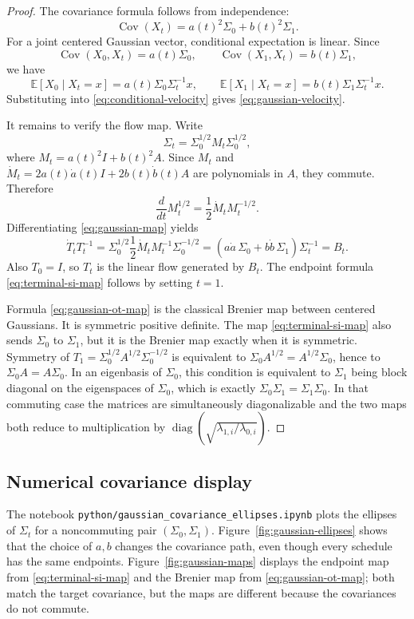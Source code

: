 \documentclass[11pt]{article}
\DeclareMathOperator{\Cov}{Cov}
\DeclareMathOperator{\diag}{diag}
\begin{document}
\begin{proof}
The covariance formula follows from independence:
\[
        \Cov(X_t)=a(t)^2\Sigma_0+b(t)^2\Sigma_1.
\]
For a joint centered Gaussian vector, conditional expectation is linear.
Since
\[
        \Cov(X_0,X_t)=a(t)\Sigma_0,\qquad
        \Cov(X_1,X_t)=b(t)\Sigma_1,
\]
we have
\[
        \mathbb E[X_0\mid X_t=x]
        =a(t)\Sigma_0\Sigma_t^{-1}x,\qquad
        \mathbb E[X_1\mid X_t=x]
        =b(t)\Sigma_1\Sigma_t^{-1}x.
\]
Substituting into \eqref{eq:conditional-velocity} gives
\eqref{eq:gaussian-velocity}.

It remains to verify the flow map.  Write
\[
        \Sigma_t=\Sigma_0^{1/2}M_t\Sigma_0^{1/2},
\]
where \(M_t=a(t)^2I+b(t)^2A\).  Since \(M_t\) and
\(\dot M_t=2a(t)\dot a(t)I+2b(t)\dot b(t)A\) are polynomials in \(A\), they
commute.  Therefore
\[
        \frac{d}{dt}M_t^{1/2}
        =\frac12\dot M_t M_t^{-1/2}.
\]
Differentiating \eqref{eq:gaussian-map} yields
\[
        \dot T_tT_t^{-1}
        =\Sigma_0^{1/2}
        \frac12\dot M_tM_t^{-1}
        \Sigma_0^{-1/2}
        =(a\dot a\,\Sigma_0+b\dot b\,\Sigma_1)\Sigma_t^{-1}
        =B_t .
\]
Also \(T_0=I\), so \(T_t\) is the linear flow generated by \(B_t\).  The
endpoint formula \eqref{eq:terminal-si-map} follows by setting \(t=1\).

Formula \eqref{eq:gaussian-ot-map} is the classical Brenier map between
centered Gaussians.  It is symmetric positive definite.  The map
\eqref{eq:terminal-si-map} also sends \(\Sigma_0\) to \(\Sigma_1\), but it is
the Brenier map exactly when it is symmetric.  Symmetry of
\(T_1=\Sigma_0^{1/2}A^{1/2}\Sigma_0^{-1/2}\) is equivalent to
\(\Sigma_0 A^{1/2}=A^{1/2}\Sigma_0\), hence to
\(\Sigma_0 A=A\Sigma_0\).  In an eigenbasis of \(\Sigma_0\), this condition is
equivalent to \(\Sigma_1\) being block diagonal on the eigenspaces of
\(\Sigma_0\), which is exactly \(\Sigma_0\Sigma_1=\Sigma_1\Sigma_0\).  In that
commuting case the matrices are simultaneously diagonalizable and the two maps
both reduce to multiplication by
\(\diag(\sqrt{\lambda_{1,i}/\lambda_{0,i}})\).
\end{proof}

\subsection{Numerical covariance display}

The notebook \texttt{python/gaussian\_covariance\_ellipses.ipynb} plots the
ellipses of \(\Sigma_t\) for a noncommuting pair
\((\Sigma_0,\Sigma_1)\).  Figure~\ref{fig:gaussian-ellipses} shows that the
choice of \(a,b\) changes the covariance path, even though every schedule has
the same endpoints.  Figure~\ref{fig:gaussian-maps} displays the endpoint map
from \eqref{eq:terminal-si-map} and the Brenier map from
\eqref{eq:gaussian-ot-map}; both match the target covariance, but the maps are
different because the covariances do not commute.
\end{document}
